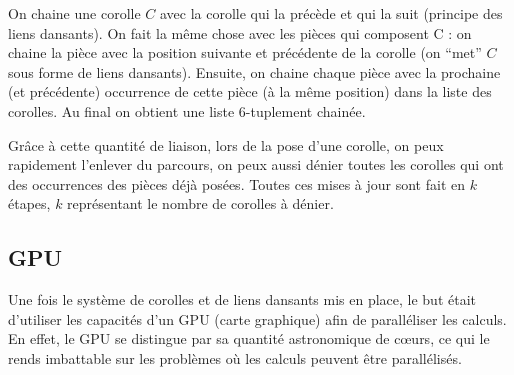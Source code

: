 	On chaine une corolle $C$ avec la corolle qui la précède et qui la suit (principe des liens dansants). On fait la même chose avec les pièces qui composent C : on chaine la pièce avec la position suivante et précédente de la corolle (on \enquote{met} $C$ sous forme de liens dansants). Ensuite, on chaine chaque pièce avec la prochaine (et précédente) occurrence de cette pièce (à la même position) dans la liste des corolles. Au final on obtient une liste 6-tuplement chainée.
	
	Grâce à cette quantité de liaison, lors de la pose d'une corolle, on peux rapidement l'enlever du parcours, on peux aussi dénier toutes les corolles qui ont des occurrences des pièces déjà posées. Toutes ces mises à jour sont fait en $k$ étapes, $k$ représentant le nombre de corolles à dénier.

	\subsection{GPU}
	
	Une fois le système de corolles et de liens dansants mis en place, le but était d'utiliser les capacités d'un GPU (carte graphique) afin de paralléliser les calculs. En effet, le GPU se distingue par sa quantité astronomique de c\oe urs, ce qui le rends imbattable sur les problèmes où les calculs peuvent être parallélisés.